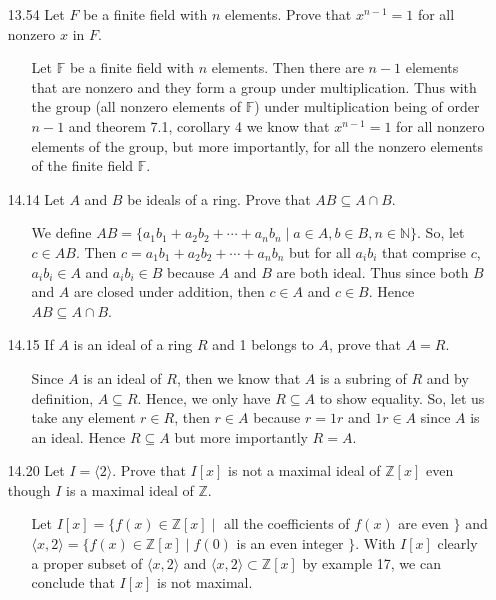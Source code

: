 \documentclass[12pt]{article}
\begin{document}
\begin{enumerate}
\item[13.54] Let $F$ be a finite field with $n$ elements. Prove that $x^{n-1} = 1$ for all nonzero $x$ in $F$.
\begin{enumerate}
\item[] Let $\mathbb{F}$ be a finite field with $n$ elements. Then there are $n - 1$ elements that are nonzero and
they form a group under multiplication. Thus with the group (all nonzero elements of $\mathbb{F}$) 
under multiplication being of order $n - 1$ and theorem 7.1, corollary 4 we know that $x^{n - 1} = 1$ for all
nonzero elements of the group, but more importantly, for all the nonzero elements of the finite field $\mathbb{F}$.
\end{enumerate}

\item[14.14] Let $A$ and $B$ be ideals of a ring. Prove that $AB \subseteq A \cap B$.
\begin{enumerate}
\item[] We define $AB = \{ a_1b_1 + a_2b_2 + \cdots + a_nb_n \mid a \in A, b \in B, n \in \mathbb{N} \}$. 
So, let $c \in AB$. Then $c = a_1b_1 + a_2b_2 + \cdots + a_nb_n$ but for all $a_ib_i$ that comprise $c$,
$a_ib_i \in A$ and $a_ib_i \in B$ because $A$ and $B$ are both ideal. 
Thus since both $B$ and $A$ are closed under addition, then $c \in A$ and $c \in B$. Hence $AB \subseteq A \cap B$.
\end{enumerate}

\item[14.15] If $A$ is an ideal of a ring $R$ and 1 belongs to $A$, prove that $A = R$.
\begin{enumerate}
\item[] Since $A$ is an ideal of $R$, then we know that $A$ is a subring of $R$ and by definition, $A \subseteq R$.
Hence, we only have $R \subseteq A$ to show equality. So, let us take any element $r \in R$, then $r \in A$ because
$r = 1r$ and $1r \in A$ since $A$ is an ideal. Hence $R \subseteq A$ but more importantly $R = A$.
\end{enumerate}

\item[14.20] Let $I = \langle 2\rangle$. Prove that $I[x]$ is not a maximal ideal of 
$\mathbb{Z}[x]$ even though $I$ is a maximal ideal of $\mathbb{Z}$.
\begin{enumerate}
\item[] Let $I[x] = \{ f(x) \in \mathbb{Z}[x] \mid $ all the coefficients of $f(x)$ are even $ \}$ and 
$\langle x, 2\rangle = \{ f(x) \in \mathbb{Z}[x] \mid f(0)$ is an even integer $\}$. With $I[x]$
clearly a proper subset of $\langle x, 2\rangle$ and $\langle x, 2\rangle \subset \mathbb{Z}[x]$ by
example 17, we can conclude that $I[x]$ is not maximal.
\end{enumerate}


\end{enumerate}
\end{document}
